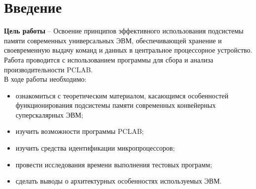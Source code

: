 \tableofcontents
\clearpage

\chapter*{Введение}
\textbf{Цель работы} -- Освоение принципов эффективного использования подсистемы
памяти современных универсальных ЭВМ, обеспечивающей хранение и своевременную
выдачу команд и данных в центральное процессорное устройство. Работа проводится с
использованием программы для сбора и анализа производительности PCLAB.
\\
В ходе работы необходимо:
\begin{itemize}
    \item ознакомиться с теоретическим материалом, касающимся особенностей
    функционирования подсистемы памяти современных конвейерных суперскалярных ЭВМ;
    \item изучить возможности программы PCLAB;
    \item изучить средства идентификации микропроцессоров;
    \item провести исследования времени выполнения тестовых программ;
    \item сделать выводы о архитектурных особенностях используемых ЭВМ.
\end{itemize}
